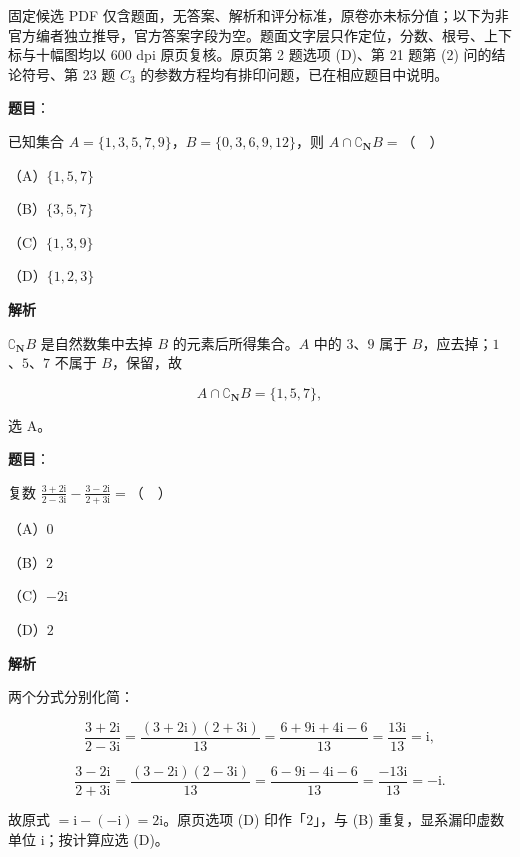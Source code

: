

\begin{gktip}
固定候选 PDF 仅含题面，无答案、解析和评分标准，原卷亦未标分值；以下为非官方编者独立推导，官方答案字段为空。题面文字层只作定位，分数、根号、上下标与十幅图均以 600 dpi 原页复核。原页第 2 题选项 (D)、第 21 题第 (2) 问的结论符号、第 23 题 $C_3$ 的参数方程均有排印问题，已在相应题目中说明。
\end{gktip}

\begin{answer}

\textbf{题目}：

已知集合 $A=\{1,3,5,7,9\}$，$B=\{0,3,6,9,12\}$，则 $A\cap\complement_{\mathbf N}B=$（　）

（A）$\{1,5,7\}$

（B）$\{3,5,7\}$

（C）$\{1,3,9\}$

（D）$\{1,2,3\}$

\textbf{解析}

$\complement_{\mathbf N}B$ 是自然数集中去掉 $B$ 的元素后所得集合。$A$ 中的 $3$、$9$ 属于 $B$，应去掉；$1$、$5$、$7$ 不属于 $B$，保留，故

\nopagebreak[4]
\[A\cap\complement_{\mathbf N}B=\{1,5,7\},\]

选 A。


\end{answer}
\begin{answer}

\textbf{题目}：

复数 $\frac{3+2\mathrm i}{2-3\mathrm i}-\frac{3-2\mathrm i}{2+3\mathrm i}=$（　）

（A）$0$

（B）$2$

（C）$-2\mathrm i$

（D）$2$

\textbf{解析}

两个分式分别化简：

\nopagebreak[4]
\[\frac{3+2\mathrm i}{2-3\mathrm i}=\frac{(3+2\mathrm i)(2+3\mathrm i)}{13}=\frac{6+9\mathrm i+4\mathrm i-6}{13}=\frac{13\mathrm i}{13}=\mathrm i,\]

\nopagebreak[4]
\[\frac{3-2\mathrm i}{2+3\mathrm i}=\frac{(3-2\mathrm i)(2-3\mathrm i)}{13}=\frac{6-9\mathrm i-4\mathrm i-6}{13}=\frac{-13\mathrm i}{13}=-\mathrm i .\]

故原式 $=\mathrm i-(-\mathrm i)=2\mathrm i$。原页选项 (D) 印作「$2$」，与 (B) 重复，显系漏印虚数单位 $\mathrm i$；按计算应选 (D)。


\end{answer}
